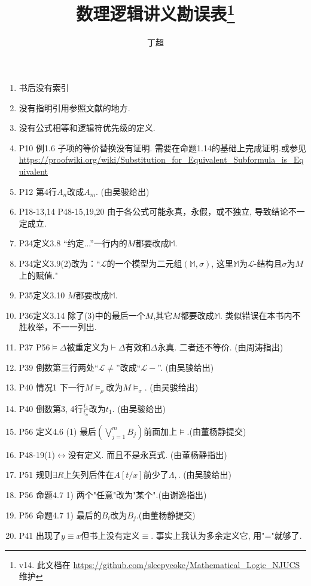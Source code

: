 \documentclass{article}
\begin{document}
\title{数理逻辑讲义勘误表\footnote{v14. 此文档在 \url{ https://github.com/sleepycoke/Mathematical_Logic_NJUCS} 维护}}
\author{丁超}
\maketitle	
\begin{enumerate}
\item 书后没有索引
\item 没有指明引用参照文献的地方.
\item 没有公式相等和逻辑符优先级的定义. 
\item P10 例1.6 子项的等价替换没有证明. 需要在命题1.14的基础上完成证明.或参见\\ \url{https://proofwiki.org/wiki/Substitution_for_Equivalent_Subformula_is_Equivalent}
\item P12 第4行$A_n$改成$A_m$. (由吴骏给出)
\item P18-13,14 P48-15,19,20 由于各公式可能永真，永假，或不独立, 导致结论不一定成立. 
\item P34定义3.8 “约定...”一行内的$M$都要改成$\mathbb{M}$. 
\item P34定义3.9(2)改为：“$\mathscr{L}$的一个模型为二元组$(\mathbb{M},\sigma)$, 这里$\mathbb{M}$为$\mathscr{L}$-结构且$\sigma$为$M$上的赋值."
\item P35定义3.10 $M$都要改成$\mathbb{M}$. 
\item P36定义3.14 除了(3)中的最后一个$M$,其它$M$都要改成$\mathbb{M}$. 类似错误在本书内不胜枚举，不一一列出. 
\item P37 P56$\models \Delta$被重定义为$\vdash \Delta$有效和$\Delta$永真. 二者还不等价. (由周涛指出)
\item P39 倒数第三行两处``$\mathscr{L}\ne$''改成``$\mathscr{L}-$''. (由吴骏给出)
\item P40 情况1 下一行$M\models_\rho$改为$M\models_\sigma$. (由吴骏给出)
\item P40 倒数第3, 4行$\frac{t_1}{t_n}$改为$t_1$. (由吴骏给出)\item P56 定义4.6 (1) 最后\((\bigvee\limits_{j=1}^m B_j)\)前面加上\(\models\).(由董杨静提交)
\item P48-19(1)$\leftrightarrow$没有定义. 而且不是永真式. (由董杨静指出)
\item P51 规则$\exists R$上矢列后件在$A[t/x]$前少了$\Lambda, $. (由吴骏给出)
\item P56 命题4.7 1) 两个"任意"改为"某个".(由谢逸指出)
\item P56 命题4.7 1) 最后的\(B_i\)改为\(B_j\).(由董杨静提交)
\item P41 出现了$y\equiv x$但书上没有定义$\equiv$. 事实上我认为多余定义它, 用"="就够了. 

\end{enumerate}
\end{document}
